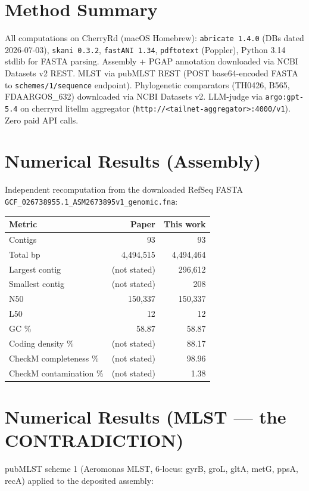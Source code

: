 \documentclass[10pt]{article}
\begin{document}
\section{Method Summary}
All computations on CherryRd (macOS Homebrew): \texttt{abricate 1.4.0} (DBs dated 2026-07-03), \texttt{skani 0.3.2}, \texttt{fastANI 1.34}, \texttt{pdftotext} (Poppler), Python 3.14 stdlib for FASTA parsing. Assembly + PGAP annotation downloaded via NCBI Datasets v2 REST. MLST via pubMLST REST (POST base64-encoded FASTA to \texttt{schemes/1/sequence} endpoint). Phylogenetic comparators (TH0426, B565, FDAARGOS\_632) downloaded via NCBI Datasets v2. LLM-judge via \texttt{argo:gpt-5.4} on cherryrd litellm aggregator (\texttt{http://<tailnet-aggregator>:4000/v1}). Zero paid API calls.

\section{Numerical Results (Assembly)}
Independent recomputation from the downloaded RefSeq FASTA \texttt{GCF\_026738955.1\_ASM2673895v1\_genomic.fna}:

\begin{center}
\begin{tabular}{@{}lrr@{}}
\toprule
Metric & Paper & This work \\
\midrule
Contigs & 93 & 93 \\
Total bp & 4{,}494{,}515 & 4{,}494{,}464 \\
Largest contig & (not stated) & 296{,}612 \\
Smallest contig & (not stated) & 208 \\
N50 & 150{,}337 & 150{,}337 \\
L50 & 12 & 12 \\
GC \% & 58.87 & 58.87 \\
Coding density \% & (not stated) & 88.17 \\
CheckM completeness \% & (not stated) & 98.96 \\
CheckM contamination \% & (not stated) & 1.38 \\
\bottomrule
\end{tabular}
\end{center}

\section{Numerical Results (MLST --- the CONTRADICTION)}

pubMLST scheme 1 (Aeromonas MLST, 6-locus: gyrB, groL, gltA, metG, ppsA, recA) applied to the deposited assembly:
\end{document}
